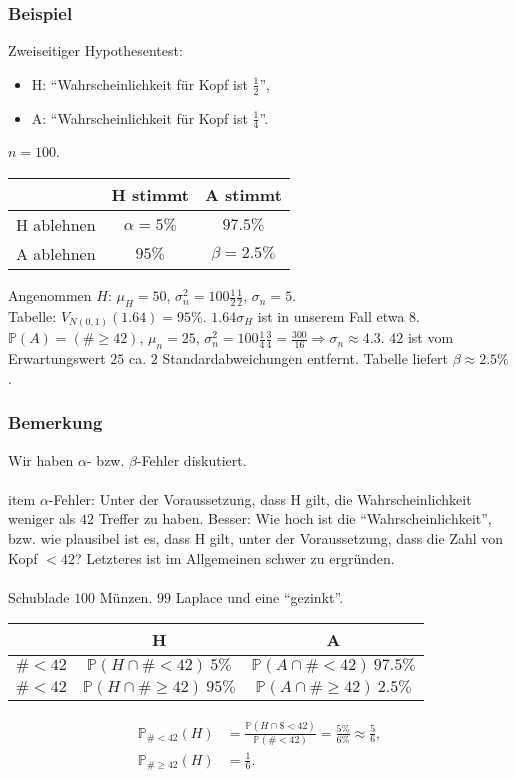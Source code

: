 \subsubsection{Beispiel}
Zweiseitiger Hypothesentest:
\begin{itemize}
\item H: ``Wahrscheinlichkeit f\"ur Kopf ist $\frac{1}{2}$'',
\item A: ``Wahrscheinlichkeit f\"ur Kopf ist $\frac{1}{4}$''.
\end{itemize}
$n=100$.
\begin{center}
\begin{tabular}{c|c|c}
~&H stimmt&A stimmt\\
\hline
H ablehnen&$\alpha=5\%$&$97.5\%$\\
\hline
A ablehnen&$95\%$&$\beta=2.5\%$\\
\end{tabular}
\end{center}
Angenommen $H$: $\mu_H=50$, $\sigma_n^2=100\frac{1}{2}\frac{1}{2}$, $\sigma_n=5$.\\
Tabelle: $V_{N(0,1)}(1.64)=95\%$. $1.64\sigma_H$ ist in unserem Fall etwa $8$.\\
$\mathbb{P}(A)=(\#\geq42)$, $\mu_n=25$, $\sigma_n^2=100\frac{1}{4}\frac{3}{4}=\frac{300}{16}\Rightarrow\sigma_n\approx4.3$. $42$ ist vom Erwartungswert $25$ ca. $2$ Standardabweichungen entfernt. Tabelle liefert $\beta\approx2.5\%$.
\subsubsection{Bemerkung}
Wir haben $\alpha$- bzw. $\beta$-Fehler diskutiert.
\\~\\
item $\alpha$-Fehler: Unter der Voraussetzung, dass H gilt, die Wahrscheinlichkeit weniger als $42$ Treffer zu haben. Besser: Wie hoch ist die ``Wahrscheinlichkeit'', bzw. wie plausibel ist es, dass H gilt, unter der Voraussetzung, dass die Zahl von Kopf $<42$? Letzteres ist im Allgemeinen schwer zu ergr\"unden.
\\~\\
 Schublade $100$ M\"unzen. $99$ Laplace und eine ``gezinkt''.
\begin{center}
\begin{tabular}{c|c|c}
~&H&A\\
\hline
$\#<42$&$\mathbb{P}(H\cap\#<42)\ 5\%$&$\mathbb{P}(A\cap\#<42)\ 97.5\%$\\
\hline
$\#<42$&$\mathbb{P}(H\cap\#\geq42)\ 95\%$&$\mathbb{P}(A\cap\#\geq42)\ 2.5\%$\\
\end{tabular}
\end{center}
\begin{align*}
\mathbb{P}_{\#<42}(H)&=\frac{\mathbb{P}(H\cap\$<42)}{\mathbb{P}(\#<42)}=\frac{5\%}{6\%}\approx\frac{5}{6},\\
\mathbb{P}_{\#\geq42}(H)&=\frac{1}{6}.
\end{align*}
